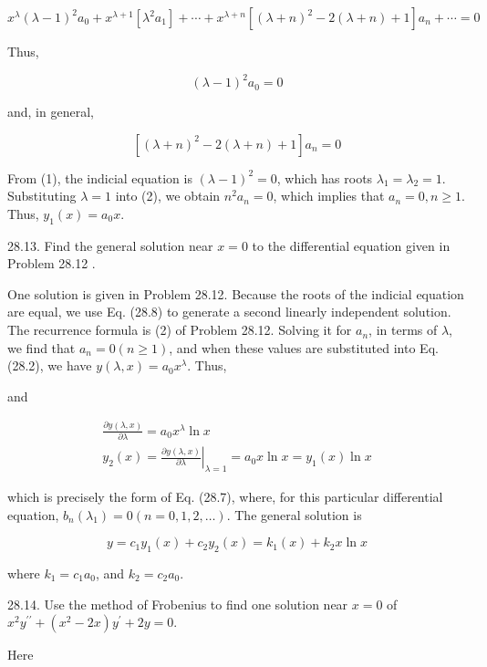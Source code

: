 \documentclass[10pt]{article}
\begin{document}
$$
x^{\lambda}(\lambda-1)^{2} a_{0}+x^{\lambda+1}\left[\lambda^{2} a_{1}\right]+\cdots+x^{\lambda+n}\left[(\lambda+n)^{2}-2(\lambda+n)+1\right] a_{n}+\cdots=0
$$

Thus,


\begin{equation*}
(\lambda-1)^{2} a_{0}=0 \tag{1}
\end{equation*}


and, in general,


\begin{equation*}
\left[(\lambda+n)^{2}-2(\lambda+n)+1\right] a_{n}=0 \tag{2}
\end{equation*}


From (1), the indicial equation is $(\lambda-1)^{2}=0$, which has roots $\lambda_{1}=\lambda_{2}=1$. Substituting $\lambda=1$ into (2), we obtain $n^{2} a_{n}=0$, which implies that $a_{n}=0, n \geq 1$. Thus, $y_{1}(x)=a_{0} x$.

28.13. Find the general solution near $x=0$ to the differential equation given in Problem 28.12 .

One solution is given in Problem 28.12. Because the roots of the indicial equation are equal, we use Eq. (28.8) to generate a second linearly independent solution. The recurrence formula is (2) of Problem 28.12. Solving it for $a_{n}$, in terms of $\lambda$, we find that $a_{n}=0(n \geq 1)$, and when these values are substituted into Eq. (28.2), we have $y(\lambda, x)=a_{0} x^{\lambda}$. Thus,

and

$$
\begin{gathered}
\frac{\partial y(\lambda, x)}{\partial \lambda}=a_{0} x^{\lambda} \ln x \\
y_{2}(x)=\left.\frac{\partial y(\lambda, x)}{\partial \lambda}\right|_{\lambda=1}=a_{0} x \ln x=y_{1}(x) \ln x
\end{gathered}
$$

which is precisely the form of Eq. (28.7), where, for this particular differential equation, $b_{n}\left(\lambda_{1}\right)=0(n=0,1,2, \ldots)$. The general solution is

$$
y=c_{1} y_{1}(x)+c_{2} y_{2}(x)=k_{1}(x)+k_{2} x \ln x
$$

where $k_{1}=c_{1} a_{0}$, and $k_{2}=c_{2} a_{0}$.

28.14. Use the method of Frobenius to find one solution near $x=0$ of $x^{2} y^{\prime \prime}+\left(x^{2}-2 x\right) y^{\prime}+2 y=0$.

Here
\end{document}

